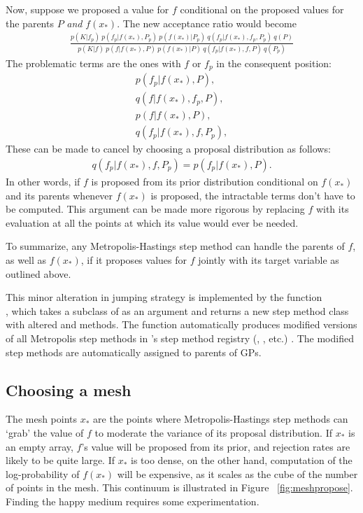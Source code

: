 \documentclass[article]{jss}
\begin{document}
Now, suppose we proposed a value for $f$ conditional on the proposed values for the parents $P$ \emph{and} $f(x_*)$. The new acceptance ratio would become
\begin{eqnarray*}
    \frac{p(K|f_p)\ p(f_p|f(x_*), P_p)\ p(f(x_*) | P_p)\ q(f_p|f(x_*),f_p, P_p)\ q(P)}{p(K|f)\ p(f|f(x_*), P)\ p(f(x_*) | P)\ q(f_p|f(x_*),f,P)\ q(P_p)}
\end{eqnarray*}
 The problematic terms are the ones with $f$ or $f_p$ in the consequent position:
\begin{eqnarray*}
    p(f_p|f(x_*), P),\\ q(f|f(x_*),f_p,P),\\ p(f|f(x_*), P),\\ q(f_p|f(x_*),f,P_p),
\end{eqnarray*}
These can be made to cancel by choosing a proposal distribution as follows:
\begin{eqnarray*}
    q(f_p|f(x_*),f,P_p) = p(f_p|f(x_*), P).
\end{eqnarray*}
In other words, if $f$ is proposed from its prior distribution conditional on $f(x_*)$ and its parents whenever $f(x_*)$ is proposed, the intractable terms don't have to be computed. This argument can be made more rigorous by replacing $f$ with its evaluation at all the points at which its value would ever be needed.

\smallskip
To summarize, any Metropolis-Hastings step method can handle the parents of $f$, as well as $f(x_*)$, if it proposes values for $f$ jointly with its target variable as outlined above. 

This minor alteration in jumping strategy is implemented by the function \\, which takes a subclass of  as an argument and returns a new step method class with altered  and  methods. The function automatically produces modified versions of all Metropolis step methods in 's step method registry (, , etc.) \citep{pymc}. The modified step methods are automatically assigned to parents of GPs.

\subsection{Choosing a mesh} 

The mesh points $x_*$ are the points where Metropolis-Hastings step methods can `grab' the value of $f$ to moderate the variance of its proposal distribution. If $x_*$ is an empty array, $f$'s value will be proposed from its prior, and rejection rates are likely to be quite large. If $x_*$ is too dense, on the other hand, computation of the log-probability of $f(x_*)$ will be expensive, as it scales as the cube of the number of points in the mesh. This continuum is illustrated in Figure~ \ref{fig:meshpropose}. Finding the happy medium requires some experimentation.
\end{document}
